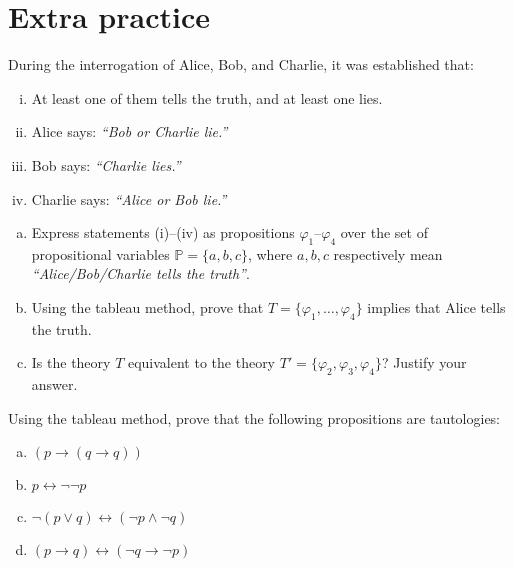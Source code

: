         
\section*{Extra practice}


\begin{problem}

    During the interrogation of Alice, Bob, and Charlie, it was established that:
    \begin{enumerate}[(i)]\it
        \item At least one of them tells the truth, and at least one lies.
        \item Alice says: \emph{``Bob or Charlie lie.''}
        \item Bob says: \emph{``Charlie lies.''}
        \item Charlie says: \emph{``Alice or Bob lie.''}
    \end{enumerate}
    \begin{enumerate}[(a)]
        \item Express statements (i)–(iv) as propositions $\varphi_1$–$\varphi_4$ over the set of propositional variables $\mathbb{P}=\{a,b,c\}$, where $a,b,c$ respectively mean {\it ``Alice/Bob/Charlie tells the truth''}.
        \item Using the tableau method, prove that $T = \{\varphi_1, \dots, \varphi_4\}$ implies that Alice tells the truth.
        \item Is the theory $T$ equivalent to the theory $T' = \{\varphi_2, \varphi_3, \varphi_4\}$? Justify your answer.    
    \end{enumerate}
    
\end{problem}
        

\begin{problem}

    Using the tableau method, prove that the following propositions are tautologies:
    \begin{enumerate}[(a)]
        \item $(p\to (q \to q))$
        \item $p \leftrightarrow \neg \neg  p$
        \item $\neg (p \vee q) \leftrightarrow (\neg p \wedge \neg q)$
        \item $(p \to q) \leftrightarrow (\neg q \to \neg p)$    
    \end{enumerate}

\end{problem} 
   

